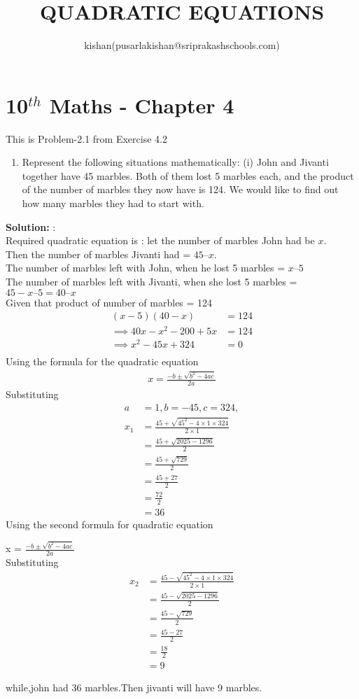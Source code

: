 \documentclass[10pt]{article}
\title{QUADRATIC EQUATIONS}
\author{kishan(pusarlakishan@sriprakashschools.com)}
\newcommand{\solution}{\noindent \textbf{Solution: }}
\begin{document}
    \maketitle
    \section*{10$^{th}$ Maths - Chapter 4}
    This is Problem-2.1 from Exercise 4.2
\begin{enumerate}
    \item Represent the following situations mathematically:
(i) John and Jivanti together have 45 marbles. Both of them lost 5 marbles each, and
the product of the number of marbles they now have is 124. We would like to find
out how many marbles they had to start with.
\end{enumerate}
\solution:\\Required quadratic equation is :
let the number of marbles John had be $x$.\\
Then the number of marbles Jivanti had = $45 – x$. \\
The number of marbles left with John, when he lost 5 marbles = $x – 5$\\
The number of marbles left with Jivanti, when she lost 5 marbles = $45 -x – 5= 40 – x$\\
Given that product of number of marbles = 124\\
\begin{align}
(x-5)(40-x) &=124\\
\implies 40x-x^2-200+5x &= 124\\
\implies x^2-45x+324 &= 0\\
\end{align}
Using the formula for the quadratic equation
\begin{align}
x = \frac{-b \pm \sqrt{b^2-4ac}}{2a}
\end{align}
Substituting 
\begin{align}
a &= 1, b = -45, c = 324,
\\
x_1 &= \frac{45+\sqrt{45^2-4\times 1 \times 324}}{2\times 1}\\
 &= \frac{45+\sqrt{2025-1296}}{2}\\
 &= \frac{45+\sqrt{729}}{2}\\
 &= \frac{45+27}{2}\\
 &= \frac{72}{2}\\
 &= 36
\end{align}
Using the second formula for quadratic equation

x = $\frac{-b \pm \sqrt{b^2-4ac}}{2a}$\\
Substituting\\
\begin{align}
x_2 &= \frac{45-\sqrt{45^2-4\times 1 \times 324}}{2\times 1}\\
 &= \frac{45-\sqrt{2025-1296}}{2}\\
 &= \frac{45-\sqrt{729}}{2}\\
 &= \frac{45-27}{2}\\
 &= \frac{18}{2}\\
 &= 9
\end{align}

while,john had 36 marbles.Then jivanti will have 9 marbles.
\end{document}

